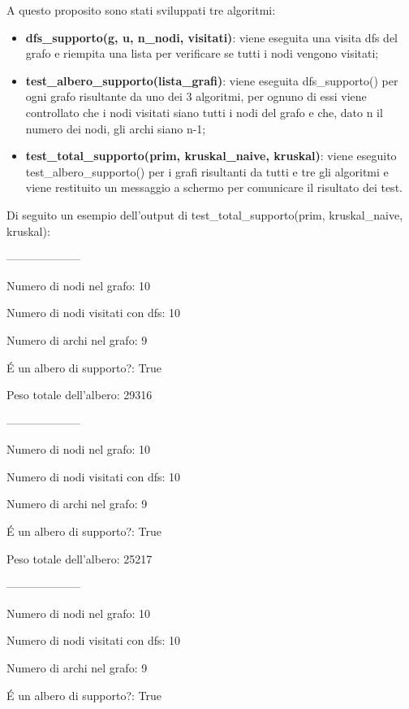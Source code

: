 A questo proposito sono stati sviluppati tre algoritmi:

\begin{itemize}
    \item \textbf{dfs\_supporto(g, u, n\_nodi, visitati)}: viene eseguita una visita dfs del grafo e riempita una lista per verificare se tutti i nodi vengono visitati;
    
    \item \textbf{test\_albero\_supporto(lista\_grafi)}: viene eseguita dfs\_supporto() per ogni grafo risultante da uno dei 3 algoritmi, per ognuno di essi viene controllato che i nodi visitati siano tutti i nodi del grafo e che, dato n il numero dei nodi, gli archi siano n-1;
    
    \item \textbf{test\_total\_supporto(prim, kruskal\_naive, kruskal)}: viene eseguito test\_albero\_supporto() per i grafi risultanti da tutti e tre gli algoritmi e viene restituito un messaggio a schermo per comunicare il risultato dei test.
    
    
\end{itemize}



Di seguito un esempio dell'output di test\_total\_supporto(prim, kruskal\_naive, kruskal):

\newpage

--------------------

Numero di nodi nel grafo:  10 

Numero di nodi visitati con dfs:  10

Numero di archi nel grafo:  9

É un albero di supporto?:  True

Peso totale dell'albero:  29316

--------------------

Numero di nodi nel grafo:  10

Numero di nodi visitati con dfs:  10

Numero di archi nel grafo:  9

É un albero di supporto?:  True

Peso totale dell'albero:  25217

--------------------

Numero di nodi nel grafo:  10

Numero di nodi visitati con dfs:  10

Numero di archi nel grafo:  9

É un albero di supporto?:  True

